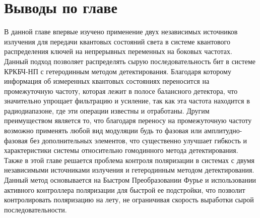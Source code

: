 \section{Выводы по главе}\label{sec:ch3/sect10}
В данной главе впервые изучено применение двух независимых источников излучения для передачи квантовых состояний света в системе квантового распределения ключей на непрерывных переменных на боковых частотах. Данный подход позволяет распределять сырую последовательность бит в системе КРКБЧ-НП с гетеродинным методом детектирования. 
Благодаря которому информация об измеренных квантовых состояниях переносится на промежуточную частоту, которая лежит в полосе балансного детектора, что значительно упрощает фильтрацию и усиление, так как эта частота находится в радиодиапазоне, где эти операции известны и отработаны. Другим преимуществом является то, что благодаря переносу на промежуточную частоту возможно применять любой вид модуляции будь то фазовая или амплитудно-фазовая без дополнительных элементов, что существенно улучшает гибкость и характеристики системы относительно гомодинного метода детектирования.
Также в этой главе решается проблема контроля поляризации в системах с двумя независимыми источниками излучения и гетеродинным методом детектирования. Данный метод основывается на Быстром Преобразовании Фурье и использовании активного контроллера поляризации для быстрой ее подстройки, что позволит контролировать поляризацию на лету, не ограничивая скорость выработки сырой последовательности.